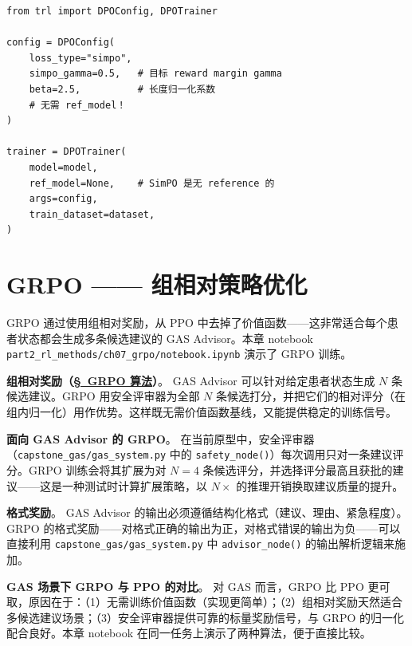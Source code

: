 \begin{examplebox}
\begin{lstlisting}[style=pythonstyle]
from trl import DPOConfig, DPOTrainer

config = DPOConfig(
    loss_type="simpo",
    simpo_gamma=0.5,   # 目标 reward margin gamma
    beta=2.5,          # 长度归一化系数
    # 无需 ref_model！
)

trainer = DPOTrainer(
    model=model,
    ref_model=None,    # SimPO 是无 reference 的
    args=config,
    train_dataset=dataset,
)
\end{lstlisting}
\end{examplebox}
\chapter{GRPO —— 组相对策略优化}
\label{grpo-group-relative-policy-optimization}

\begin{keybox}
GRPO 通过使用组相对奖励，从 PPO 中去掉了价值函数——这非常适合每个患者状态都会生成多条候选建议的 GAS Advisor。本章 notebook \texttt{part2\_rl\_methods/ch07\_grpo/notebook.ipynb} 演示了 GRPO 训练。

\textbf{组相对奖励（\hyperref[the-grpo-algorithm]{\S~GRPO 算法}）}。
GAS Advisor 可以针对给定患者状态生成 $N$ 条候选建议。GRPO 用安全评审器为全部 $N$ 条候选打分，并把它们的相对评分（在组内归一化）用作优势。这样既无需价值函数基线，又能提供稳定的训练信号。

\textbf{面向 GAS Advisor 的 GRPO}。
在当前原型中，安全评审器（\texttt{capstone\_gas/gas\_system.py} 中的 \texttt{safety\_node()}）每次调用只对一条建议评分。GRPO 训练会将其扩展为对 $N=4$ 条候选评分，并选择评分最高且获批的建议——这是一种测试时计算扩展策略，以 $N\times$ 的推理开销换取建议质量的提升。

\textbf{格式奖励}。
GAS Advisor 的输出必须遵循结构化格式（建议、理由、紧急程度）。GRPO 的格式奖励——对格式正确的输出为正，对格式错误的输出为负——可以直接利用 \texttt{capstone\_gas/gas\_system.py} 中 \texttt{advisor\_node()} 的输出解析逻辑来施加。

\textbf{GAS 场景下 GRPO 与 PPO 的对比}。
对 GAS 而言，GRPO 比 PPO 更可取，原因在于：（1）无需训练价值函数（实现更简单）；（2）组相对奖励天然适合多候选建议场景；（3）安全评审器提供可靠的标量奖励信号，与 GRPO 的归一化配合良好。本章 notebook 在同一任务上演示了两种算法，便于直接比较。
\end{keybox}

